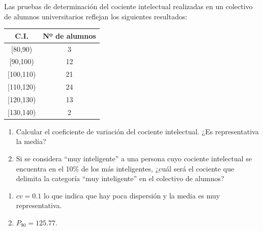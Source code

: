 {Las pruebas de determinación del cociente intelectual realizadas en un colectivo de alumnos universitarios
reflejan los siguientes resultados:
\begin{center}
\begin{tabular}{|c|c|}
\hline
   C.I.    & Nº de alumnos \\
\hline
  [80,90)  &       3       \\
\hline
 [90,100)  &      12       \\
\hline
 [100,110) &      21       \\
\hline
 [110,120) &      24       \\
\hline
 [120,130) &      13       \\
\hline
 [130,140) &       2       \\
\hline
\end{tabular}
\end{center}
\begin{enumerate}
\item Calcular el coeficiente de variación del cociente intelectual. ¿Es representativa la media?
\item Si se considera ``muy inteligente'' a una persona cuyo cociente intelectual se encuentra en el 10\% de los más inteligentes, ¿cuál será el cociente que delimita la categoría ``muy inteligente'' en el colectivo de alumnos?
\end{enumerate}
}
{\begin{enumerate}
\item $cv=0.1$ lo que indica que hay poca dispersión y la media es muy representativa.
\item $P_{90}=125.77$.
\end{enumerate}
}
